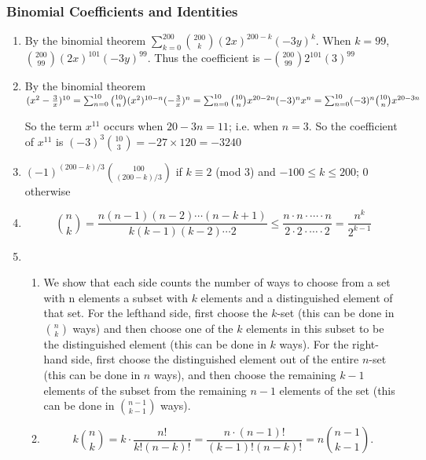 \documentclass{../../cls/sig-alternate-05-2015}
\begin{document}
\subsubsection{Binomial Coefficients and Identities}
\begin{enumerate}
	\item By the binomial theorem $\sum_{k=0}^{200}\binom{200}{k}(2x)^{200-k}(-3y)^k$. When $k=99$, $\binom{200}{99}(2x)^{101}(-3y)^{99}$. Thus the coefficient is $-\binom{200}{99}2^{101}(3)^{99}$
	
	\item By the binomial theorem 	$(x^2-\frac{3}{x})^{10}\\=\sum_{n=0}^{10}\binom{10}{n}(x^2)^{10-n}(-\frac{3}{x})^n
	\\=\sum_{n=0}^{10}\binom{10}{n}x^{20-2n}(-3)^nx^n=\sum_{n=0}^{10}(-3)^n\binom{10}{n} x^{20-3n}$
	
	So the term $x^{11}$ occurs when $20-3n=11$; i.e. when $n=3$. So the coefficient of $x^{11}$ is $(-3)^3\binom{10}{3}=-27\times 120 = -3240$
	
	\item $(-1)^{(200-k)/3} \binom{100}
	{(200-k)/3}$ if $k \equiv 2$ (mod $3$) and $-100 \leq
	k \leq 200$; $0$ otherwise
	
	\item \begin{equation}
	\binom{n}{k} = \frac{n(n - 1)(n - 2) \cdots (n - k + 1)}{k(k - 1)(k - 2) \cdots 2} \le \frac{n \cdot n \cdot \cdots \cdot n}{2 \cdot 2 \cdot \cdots \cdot 2} = \frac{n^k}{2^{k - 1}}
	\end{equation}
	
	\item \begin{enumerate}
		\item We show that each side counts the number of ways
		to choose from a set with n elements a subset with $k$ elements
		and a distinguished element of that set. For the lefthand
		side, first choose the $k$-set (this can be done in $\binom{n}{k}$ ways)
		and then choose one of the $k$ elements in this subset to be
		the distinguished element (this can be done in $k$ ways). For
		the right-hand side, first choose the distinguished element out
		of the entire $n$-set (this can be done in $n$ ways), and then
		choose the remaining $k - 1$ elements of the subset from the
		remaining $n - 1$ elements of the set (this can be done in $\binom{n - 1}{k - 1}$ ways).
		\item \begin{equation}
			k \binom{n}{k} = k \cdot \frac{n!}{k!(n - k)!} = \frac{n \cdot (n - 1)!}{(k - 1)!(n - k)!} = n \binom{n - 1}{k - 1}.
		\end{equation}
	\end{enumerate}
	
\end{enumerate}
\end{document}
